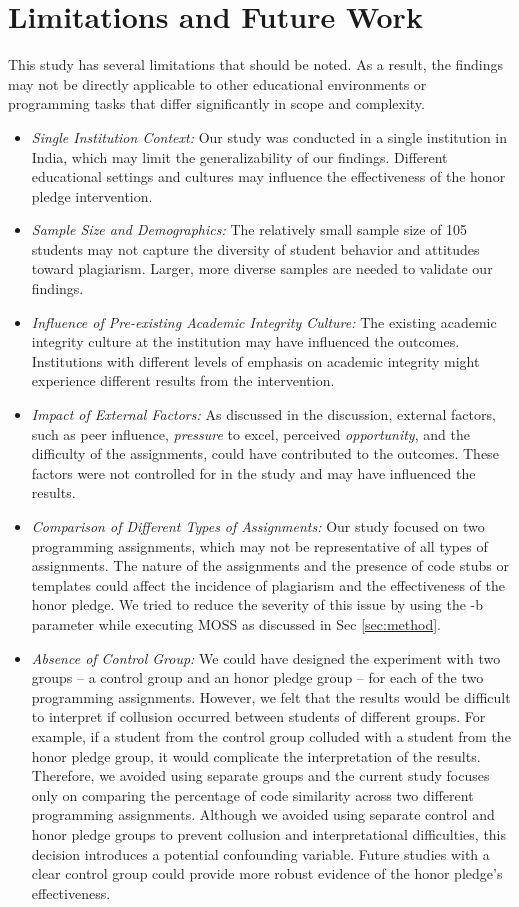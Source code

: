 \section{Limitations and Future Work}
\label{sec:limitations}
This study has several limitations that should be noted. As a result, the findings may not be directly applicable to other educational environments or programming tasks that differ significantly in scope and complexity.

\begin{itemize}
    \item \textit{Single Institution Context:} Our study was conducted in a single institution in India, which may limit the generalizability of our findings. Different educational settings and cultures may influence the effectiveness of the honor pledge intervention.
    \item \textit{Sample Size and Demographics:} The relatively small sample size of 105 students may not capture the diversity of student behavior and attitudes toward plagiarism. Larger, more diverse samples are needed to validate our findings.
    \item \textit{Influence of Pre-existing Academic Integrity Culture:} The existing academic integrity culture at the institution may have influenced the outcomes. Institutions with different levels of emphasis on academic integrity might experience different results from the intervention.
    \item \textit{Impact of External Factors:} As discussed in the discussion, external factors, such as peer influence, \textit{pressure} to excel, perceived \textit{opportunity}, and the difficulty of the assignments, could have contributed to the outcomes. These factors were not controlled for in the study and may have influenced the results.
    \item \textit{Comparison of Different Types of Assignments:} Our study focused on two programming assignments, which may not be representative of all types of assignments. The nature of the assignments and the presence of code stubs or templates could affect the incidence of plagiarism and the effectiveness of the honor pledge. We tried to reduce the severity of this issue by using the -b parameter while executing MOSS as discussed in Sec \ref{sec:method}.
    \item \textit{Absence of Control Group:} We could have designed the experiment with two groups – a control group and an honor pledge group – for each of the two programming assignments. However, we felt that the results would be difficult to interpret if collusion occurred between students of different groups. For example, if a student from the control group colluded with a student from the honor pledge group, it would complicate the interpretation of the results. Therefore, we avoided using separate groups and the current study focuses only on comparing the percentage of code similarity across two different programming assignments. Although we avoided using separate control and honor pledge groups to prevent collusion and interpretational difficulties, this decision introduces a potential confounding variable. Future studies with a clear control group could provide more robust evidence of the honor pledge's effectiveness.

\end{itemize}
